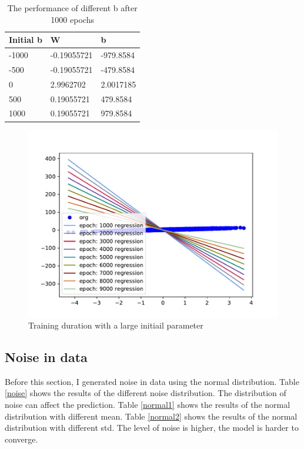 \documentclass{article}
\begin{document}
\begin{table}[!h]
  \caption{The performance of different b after 1000 epochs}
  \label{tab:b}
  \centering
  \begin{tabular}{lll}
    \toprule
    Initial b     & W     & b  \\
    \midrule
    -1000 & -0.19055721  & -979.8584     \\
    -500     & -0.19055721 & -479.8584     \\
    0     & 2.9962702       & 2.0017185  \\
    500     & 0.19055721 & 479.8584      \\
    1000    & 0.19055721     & 979.8584  \\
    \bottomrule
  \end{tabular}
\end{table}


\begin{figure}[!h]
  \centering
  \includegraphics[scale=0.5]{imgs/epoch.pdf}
  \caption{Training duration with a large initiail parameter}
  \label{epoch}
\end{figure}

\subsection{Noise in data}
Before this section, I generated noise in data using the normal distribution. Table \ref{noise} shows the results of the different noise distribution. The distribution of noise can affect the prediction. Table \ref{normal1} shows the results of the normal distribution with different mean. Table \ref{normal2} shows the results of the normal distribution with different std. The level of noise is higher, the model is harder to converge.
\end{document}

